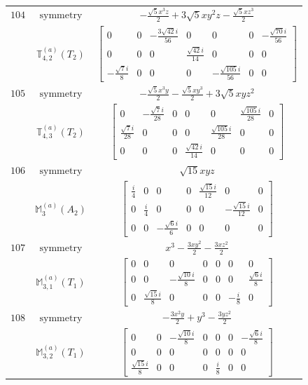 \documentclass[fleqn,8pt,landscape]{jsarticle}
\begin{document}
\begin{longtable}{ccc}
$ 104 $ & $ \text{symmetry} $ & $ - \frac{\sqrt{5} x^{3} z}{2} + 3 \sqrt{5} x y^{2} z - \frac{\sqrt{5} x z^{3}}{2} $ \\
$  $ & $ \mathbb{T}_{4,2}^{(a)}(T_{2}) $ & $ \begin{bmatrix} 0 & 0 & - \frac{3 \sqrt{42} i}{56} & 0 & 0 & 0 & - \frac{\sqrt{70} i}{56} \\ 0 & 0 & 0 & \frac{\sqrt{42} i}{14} & 0 & 0 & 0 \\ - \frac{\sqrt{7} i}{8} & 0 & 0 & 0 & - \frac{\sqrt{105} i}{56} & 0 & 0 \end{bmatrix} $ \\ \hline
$ 105 $ & $ \text{symmetry} $ & $ - \frac{\sqrt{5} x^{3} y}{2} - \frac{\sqrt{5} x y^{3}}{2} + 3 \sqrt{5} x y z^{2} $ \\
$  $ & $ \mathbb{T}_{4,3}^{(a)}(T_{2}) $ & $ \begin{bmatrix} 0 & - \frac{\sqrt{7} i}{28} & 0 & 0 & 0 & \frac{\sqrt{105} i}{28} & 0 \\ \frac{\sqrt{7} i}{28} & 0 & 0 & 0 & \frac{\sqrt{105} i}{28} & 0 & 0 \\ 0 & 0 & 0 & \frac{\sqrt{42} i}{14} & 0 & 0 & 0 \end{bmatrix} $ \\ \hline
$ 106 $ & $ \text{symmetry} $ & $ \sqrt{15} x y z $ \\
$  $ & $ \mathbb{M}_{3}^{(a)}(A_{2}) $ & $ \begin{bmatrix} \frac{i}{4} & 0 & 0 & 0 & \frac{\sqrt{15} i}{12} & 0 & 0 \\ 0 & \frac{i}{4} & 0 & 0 & 0 & - \frac{\sqrt{15} i}{12} & 0 \\ 0 & 0 & - \frac{\sqrt{6} i}{6} & 0 & 0 & 0 & 0 \end{bmatrix} $ \\ \hline
$ 107 $ & $ \text{symmetry} $ & $ x^{3} - \frac{3 x y^{2}}{2} - \frac{3 x z^{2}}{2} $ \\
$  $ & $ \mathbb{M}_{3,1}^{(a)}(T_{1}) $ & $ \begin{bmatrix} 0 & 0 & 0 & 0 & 0 & 0 & 0 \\ 0 & 0 & - \frac{\sqrt{10} i}{8} & 0 & 0 & 0 & \frac{\sqrt{6} i}{8} \\ 0 & \frac{\sqrt{15} i}{8} & 0 & 0 & 0 & - \frac{i}{8} & 0 \end{bmatrix} $ \\ \hline
$ 108 $ & $ \text{symmetry} $ & $ - \frac{3 x^{2} y}{2} + y^{3} - \frac{3 y z^{2}}{2} $ \\
$  $ & $ \mathbb{M}_{3,2}^{(a)}(T_{1}) $ & $ \begin{bmatrix} 0 & 0 & - \frac{\sqrt{10} i}{8} & 0 & 0 & 0 & - \frac{\sqrt{6} i}{8} \\ 0 & 0 & 0 & 0 & 0 & 0 & 0 \\ \frac{\sqrt{15} i}{8} & 0 & 0 & 0 & \frac{i}{8} & 0 & 0 \end{bmatrix} $ \\ \hline

\end{longtable}
\end{document}
